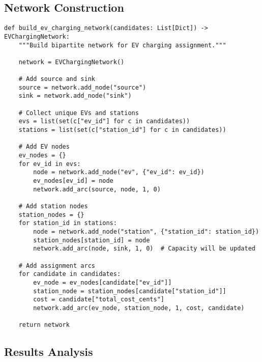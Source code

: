 \documentclass[12pt,a4paper]{article}
\begin{document}
\subsection{Network Construction}

\begin{lstlisting}[caption=Building EV Charging Network]
def build_ev_charging_network(candidates: List[Dict]) -> EVChargingNetwork:
    """Build bipartite network for EV charging assignment."""
    
    network = EVChargingNetwork()
    
    # Add source and sink
    source = network.add_node("source")
    sink = network.add_node("sink")
    
    # Collect unique EVs and stations
    evs = list(set(c["ev_id"] for c in candidates))
    stations = list(set(c["station_id"] for c in candidates))
    
    # Add EV nodes
    ev_nodes = {}
    for ev_id in evs:
        node = network.add_node("ev", {"ev_id": ev_id})
        ev_nodes[ev_id] = node
        network.add_arc(source, node, 1, 0)
    
    # Add station nodes
    station_nodes = {}
    for station_id in stations:
        node = network.add_node("station", {"station_id": station_id})
        station_nodes[station_id] = node
        network.add_arc(node, sink, 1, 0)  # Capacity will be updated
    
    # Add assignment arcs
    for candidate in candidates:
        ev_node = ev_nodes[candidate["ev_id"]]
        station_node = station_nodes[candidate["station_id"]]
        cost = candidate["total_cost_cents"]
        network.add_arc(ev_node, station_node, 1, cost, candidate)
    
    return network
\end{lstlisting}

\subsection{Results Analysis}
\end{document}
